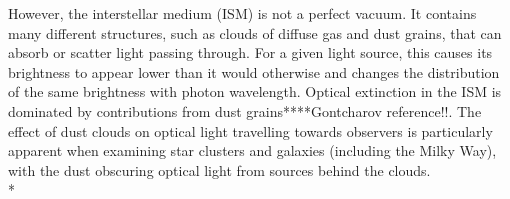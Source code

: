 \documentclass[12pt, a4paper]{report}
\begin{document}
However, the interstellar medium (ISM) is not a perfect vacuum. It contains many different structures, such as clouds of diffuse gas and dust grains, that can absorb or scatter light passing through. For a given light source, this causes its brightness to appear lower than it would otherwise and changes the distribution of the same brightness with photon wavelength. Optical extinction in the ISM is dominated by contributions from dust grains****Gontcharov reference!!. The effect of dust clouds on optical light travelling towards observers is particularly apparent when examining star clusters and galaxies (including the Milky Way), with the dust obscuring optical light from sources behind the clouds. \\*





\end{document}
